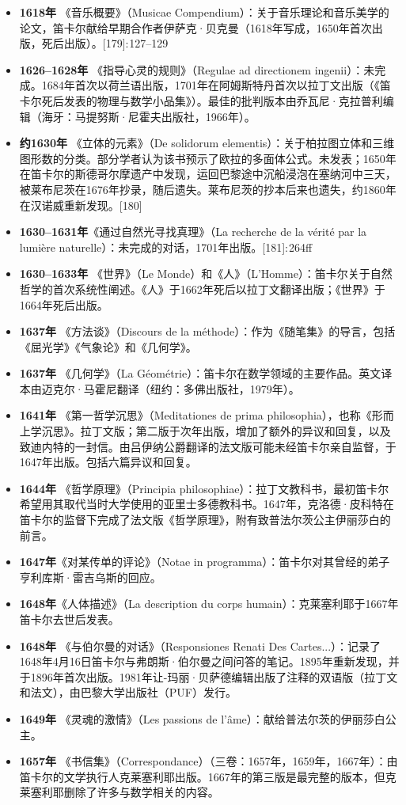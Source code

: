 \begin{itemize}
\item \textbf{1618年} 《音乐概要》（Musicae Compendium）：关于音乐理论和音乐美学的论文，笛卡尔献给早期合作者伊萨克·贝克曼（1618年写成，1650年首次出版，死后出版）。[179]: 127–129 
\item \textbf{1626–1628年} 《指导心灵的规则》（Regulae ad directionem ingenii）：未完成。1684年首次以荷兰语出版，1701年在阿姆斯特丹首次以拉丁文出版（《笛卡尔死后发表的物理与数学小品集》）。最佳的批判版本由乔瓦尼·克拉普利编辑（海牙：马提努斯·尼霍夫出版社，1966年）。
\item \textbf{约1630年} 《立体的元素》（De solidorum elementis）：关于柏拉图立体和三维图形数的分类。部分学者认为该书预示了欧拉的多面体公式。未发表；1650年在笛卡尔的斯德哥尔摩遗产中发现，运回巴黎途中沉船浸泡在塞纳河中三天，被莱布尼茨在1676年抄录，随后遗失。莱布尼茨的抄本后来也遗失，约1860年在汉诺威重新发现。[180]
\item \textbf{1630–1631年}《通过自然光寻找真理》（La recherche de la vérité par la lumière naturelle）：未完成的对话，1701年出版。[181]: 264ff 
\item \textbf{1630–1633年} 《世界》（Le Monde）和《人》（L'Homme）：笛卡尔关于自然哲学的首次系统性阐述。《人》于1662年死后以拉丁文翻译出版；《世界》于1664年死后出版。
\item \textbf{1637年} 《方法谈》（Discours de la méthode）：作为《随笔集》的导言，包括《屈光学》《气象论》和《几何学》。
\item \textbf{1637年} 《几何学》（La Géométrie）：笛卡尔在数学领域的主要作品。英文译本由迈克尔·马霍尼翻译（纽约：多佛出版社，1979年）。
\item \textbf{1641年} 《第一哲学沉思》（Meditationes de prima philosophia），也称《形而上学沉思》。拉丁文版；第二版于次年出版，增加了额外的异议和回复，以及致迪内特的一封信。由吕伊纳公爵翻译的法文版可能未经笛卡尔亲自监督，于1647年出版。包括六篇异议和回复。
\item \textbf{1644年} 《哲学原理》（Principia philosophiae）：拉丁文教科书，最初笛卡尔希望用其取代当时大学使用的亚里士多德教科书。1647年，克洛德·皮科特在笛卡尔的监督下完成了法文版《哲学原理》，附有致普法尔茨公主伊丽莎白的前言。
\item \textbf{1647年}《对某传单的评论》（Notae in programma）：笛卡尔对其曾经的弟子亨利库斯·雷吉乌斯的回应。
\item \textbf{1648年}《人体描述》（La description du corps humain）：克莱塞利耶于1667年笛卡尔去世后发表。
\item \textbf{1648年} 《与伯尔曼的对话》（Responsiones Renati Des Cartes...）：记录了1648年4月16日笛卡尔与弗朗斯·伯尔曼之间问答的笔记。1895年重新发现，并于1896年首次出版。1981年让-玛丽·贝萨德编辑出版了注释的双语版（拉丁文和法文），由巴黎大学出版社（PUF）发行。
\item \textbf{1649年} 《灵魂的激情》（Les passions de l'âme）：献给普法尔茨的伊丽莎白公主。
\item \textbf{1657年} 《书信集》（Correspondance）（三卷：1657年，1659年，1667年）：由笛卡尔的文学执行人克莱塞利耶出版。1667年的第三版是最完整的版本，但克莱塞利耶删除了许多与数学相关的内容。
\end{itemize}
